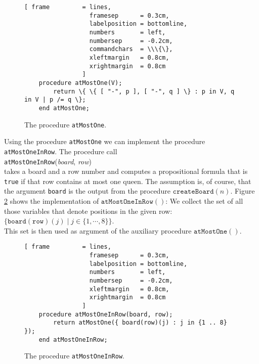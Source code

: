 \begin{figure}[!ht]
  \centering
\begin{Verbatim}[ frame         = lines, 
                  framesep      = 0.3cm, 
                  labelposition = bottomline,
                  numbers       = left,
                  numbersep     = -0.2cm,
                  commandchars  = \\\{\},
                  xleftmargin   = 0.8cm,
                  xrightmargin  = 0.8cm
                ]
    procedure atMostOne(V);
        return \{ \{ [ "-", p ], [ "-", q ] \} : p in V, q in V | p /= q \};
    end atMostOne;
\end{Verbatim}
\vspace*{-0.3cm}
  \caption{The procedure \texttt{atMostOne}.}
  \label{fig:atMostOne}
\end{figure}

Using the procedure \texttt{atMostOne} we can implement the procedure 
\texttt{atMostOneInRow}.  The procedure call \\[0.2cm]
\hspace*{1.3cm} \texttt{atMostOneInRow}(\textsl{board}, \textsl{row}) \\[0.2cm]
takes a board and a row number and computes a propositional formula that is \texttt{true}
if that row contains at most one queen.  The assumption is, of course, that the argument
\texttt{board} is the output from the procedure $\mathtt{createBoard}(n)$.
Figure \ref{fig:atMostOneInRow} shows the implementation of  $\texttt{atMostOneInRow}()$: 
We collect the set of all those variables that denote positions in the given row:
\\[0.2cm]
\hspace*{1.3cm}
$\bigl\{ \mathtt{board}(\mathtt{row})(j) \mid j \in \{1, \cdots, 8 \} \bigr\}$.
\\[0.2cm]
This set is then used as argument of the auxiliary procedure $\texttt{atMostOne}()$.

\begin{figure}[!ht]
  \centering
\begin{Verbatim}[ frame         = lines, 
                  framesep      = 0.3cm, 
                  labelposition = bottomline,
                  numbers       = left,
                  numbersep     = -0.2cm,
                  xleftmargin   = 0.8cm,
                  xrightmargin  = 0.8cm
                ]
    procedure atMostOneInRow(board, row);
        return atMostOne({ board(row)(j) : j in {1 .. 8} });
    end atMostOneInRow;
\end{Verbatim}
\vspace*{-0.3cm}
  \caption{The procedure \texttt{atMostOneInRow}.}
  \label{fig:atMostOneInRow}
\end{figure}

